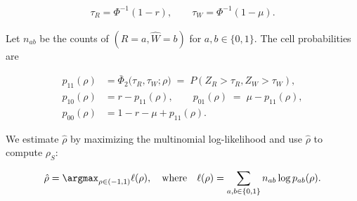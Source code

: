 \vspace{-1em}
\begin{equation}
    \begin{aligned}
        \tau_R=\Phi^{-1}(1-r), \qquad \tau_W=\Phi^{-1}(1-\mu).
    \end{aligned}
\end{equation}
\vspace{-1.5em}

Let $n_{ab}$ be the counts of $(R=a, \hat{W}=b)$ for $a,b\in\{0,1\}$. The cell probabilities are

\vspace{-1em}
\begin{equation}
    \begin{aligned}
    p_{11}(\rho) &= \bar\Phi_2\!\big(\tau_R,\tau_W;\rho\big) \;=\; P(Z_R>\tau_R, Z_W>\tau_W),\\
    p_{10}(\rho) &= r - p_{11}(\rho),\qquad
    p_{01}(\rho) \;=\; \mu - p_{11}(\rho),\\
    p_{00}(\rho) &= 1 - r - \mu + p_{11}(\rho).
    \end{aligned}
\end{equation}
\vspace{-1em}

We estimate $\hat\rho$ by maximizing the multinomial log-likelihood and use $\hat\rho$ to compute $\rho_S$:

\vspace{-1em}
\begin{equation}
    \begin{aligned}
        \hat\rho = \argmax_{\rho \in (-1,1)} \ell(\rho), \quad \text{where} \quad \ell(\rho) = \sum_{a,b\in\{0,1\}} n_{ab} \log p_{ab}(\rho).
        \label{eq:ri-estimation}
    \end{aligned}
\end{equation}
